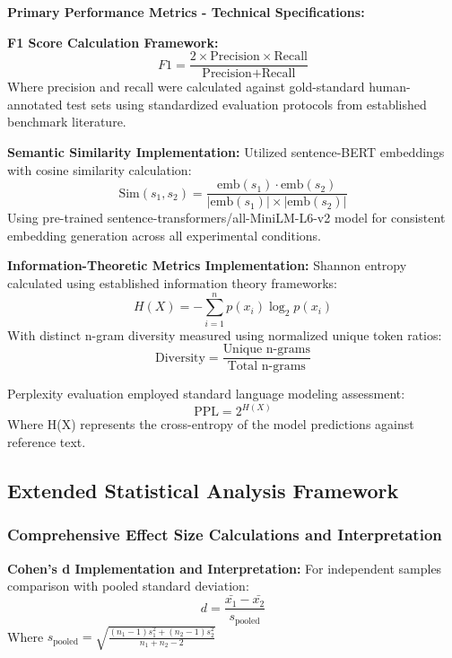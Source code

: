 \documentclass{article}
\begin{document}
\textbf{Primary Performance Metrics - Technical Specifications:}

\textbf{F1 Score Calculation Framework:}
\begin{equation}
F1 = \frac{2 \times \text{Precision} \times \text{Recall}}{\text{Precision} + \text{Recall}}
\end{equation}
Where precision and recall were calculated against gold-standard human-annotated test sets using standardized evaluation protocols from established benchmark literature.

\textbf{Semantic Similarity Implementation:}
Utilized sentence-BERT embeddings with cosine similarity calculation:
\begin{equation}
\text{Sim}(s_1, s_2) = \frac{\text{emb}(s_1) \cdot \text{emb}(s_2)}{|\text{emb}(s_1)| \times |\text{emb}(s_2)|}
\end{equation}
Using pre-trained sentence-transformers/all-MiniLM-L6-v2 model for consistent embedding generation across all experimental conditions.

\textbf{Information-Theoretic Metrics Implementation:}
Shannon entropy calculated using established information theory frameworks:
\begin{equation}
H(X) = -\sum_{i=1}^{n} p(x_i) \log_2 p(x_i)
\end{equation}
With distinct n-gram diversity measured using normalized unique token ratios:
\begin{equation}
\text{Diversity} = \frac{\text{Unique n-grams}}{\text{Total n-grams}}
\end{equation}

Perplexity evaluation employed standard language modeling assessment:
\begin{equation}
\text{PPL} = 2^{H(X)}
\end{equation}
Where H(X) represents the cross-entropy of the model predictions against reference text.

\subsection{Extended Statistical Analysis Framework}
\label{appendix:statistical_methods}

\subsubsection{Comprehensive Effect Size Calculations and Interpretation}

\textbf{Cohen's d Implementation and Interpretation:}
For independent samples comparison with pooled standard deviation:
\begin{equation}
d = \frac{\bar{x_1} - \bar{x_2}}{s_{\text{pooled}}}
\end{equation}
Where $s_{\text{pooled}} = \sqrt{\frac{(n_1-1)s_1^2 + (n_2-1)s_2^2}{n_1 + n_2 - 2}}$
\end{document}
